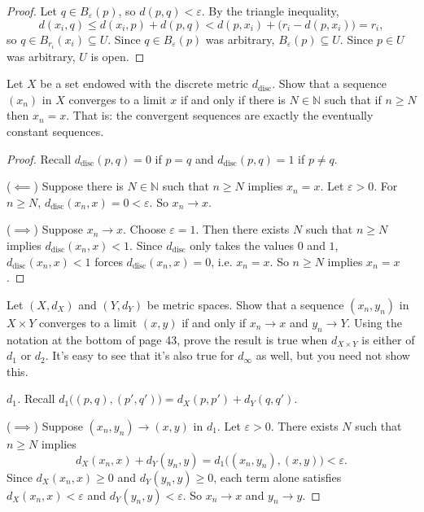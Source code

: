 \documentclass[minion]{homework}
\newcommand{\Nats}{\ensuremath{\mathbb N}} %
\begin{document}
\begin{problems}
\begin{proof}
  Let $q \in B_\varepsilon(p)$, so $d(p,q) < \varepsilon$. By the triangle inequality,
  $$d(x_i, q) \leq d(x_i,p) + d(p,q) < d(p,x_i) + \big(r_i - d(p,x_i)\big) = r_i,$$
  so $q \in B_{r_i}(x_i) \subseteq U$. Since $q \in B_\varepsilon(p)$ was arbitrary, $B_\varepsilon(p) \subseteq U$. Since $p \in U$ was arbitrary, $U$ is open.
\end{proof}

\problem Let $X$ be a set endowed with the discrete metric $d_{\mathrm{disc}}$.
Show that a sequence $(x_n)$ in $X$ converges to a limit $x$ if and only
if there is $N\in \Nats$ such that if $n\ge N$ then $x_n = x$.
That is: the convergent sequences are exactly the eventually constant sequences. \newline
\begin{proof}
  Recall $d_{\mathrm{disc}}(p,q) = 0$ if $p = q$ and $d_{\mathrm{disc}}(p,q) = 1$ if $p \ne q$.

  ($\impliedby$) Suppose there is $N \in \Nats$ such that $n \geq N$ implies $x_n = x$. Let $\varepsilon > 0$. For $n \geq N$, $d_{\mathrm{disc}}(x_n,x) = 0 < \varepsilon$. So $x_n \to x$.

  ($\implies$) Suppose $x_n \to x$. Choose $\varepsilon = 1$. Then there exists $N$ such that $n \geq N$ implies $d_{\mathrm{disc}}(x_n,x) < 1$. Since $d_{\mathrm{disc}}$ only takes the values $0$ and $1$, $d_{\mathrm{disc}}(x_n,x) < 1$ forces $d_{\mathrm{disc}}(x_n,x) = 0$, i.e. $x_n = x$. So $n \geq N$ implies $x_n = x$.
\end{proof}

\problem Let $(X,d_X)$ and $(Y,d_Y)$ be metric spaces.  Show that
a sequence $(x_n,y_n)$ in $X\times Y$ converges to a limit $(x,y)$
if and only if $x_n\to x$ and $y_n\to Y$. Using the notation
at the bottom of page 43, prove the result
is true when $d_{X\times Y}$ is either of $d_1$ or $d_2$. It's easy to
see that it's also true for $d_\infty$ as well, but you need not show this. \newline
\begin{proof}[$d_1$]
  Recall $d_1\big((p,q),(p',q')\big) = d_X(p,p') + d_Y(q,q')$.

  ($\implies$) Suppose $(x_n,y_n) \to (x,y)$ in $d_1$. Let $\varepsilon > 0$. There exists $N$ such that $n \geq N$ implies
  $$d_X(x_n,x) + d_Y(y_n,y) = d_1\big((x_n,y_n),(x,y)\big) < \varepsilon.$$
  Since $d_X(x_n,x) \geq 0$ and $d_Y(y_n,y) \geq 0$, each term alone satisfies $d_X(x_n,x) < \varepsilon$ and $d_Y(y_n,y) < \varepsilon$. So $x_n \to x$ and $y_n \to y$.


\end{proof}
\end{problems}
\end{document}
